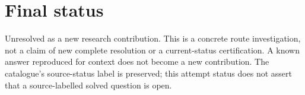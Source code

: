 \documentclass[11pt]{article}
\begin{document}
\section{Final status}
Unresolved as a new research contribution. This is a concrete route investigation,
not a claim of new complete resolution or a current-status certification. A known
answer reproduced for context does not become a new contribution. The catalogue's
source-status label is preserved; this attempt status does not assert that a
source-labelled solved question is open.
\end{document}
